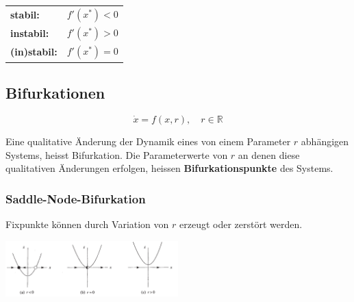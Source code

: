 \begin{tabular}{ll}
	\textbf{stabil:} \quad & $f'(x^*) < 0$ \\
	\textbf{instabil:} & $f'(x^*) > 0$ \\
	\textbf{(in)stabil:} & $f'(x^*) = 0$ \\
\end{tabular}

\begin{multicols}{2}
	\subsection{Bifurkationen}
	
	\begin{equation*}
		\dot{x} = f(x,r), \quad r \in \mathbb{R}
	\end{equation*}
	
	Eine qualitative Änderung der Dynamik eines von einem Parameter $r$ abhängigen Systems, heisst Bifurkation. Die Parameterwerte von $r$ an denen diese qualitativen Änderungen erfolgen, heissen \textbf{Bifurkationspunkte} des Systems.
	\columnbreak
	\subsubsection{Saddle-Node-Bifurkation}
	Fixpunkte können durch Variation von $r$ erzeugt oder zerstört werden.
	
	\includegraphics[width=0.5\textwidth]{./images/Saddle_Node.png}
\end{multicols}


